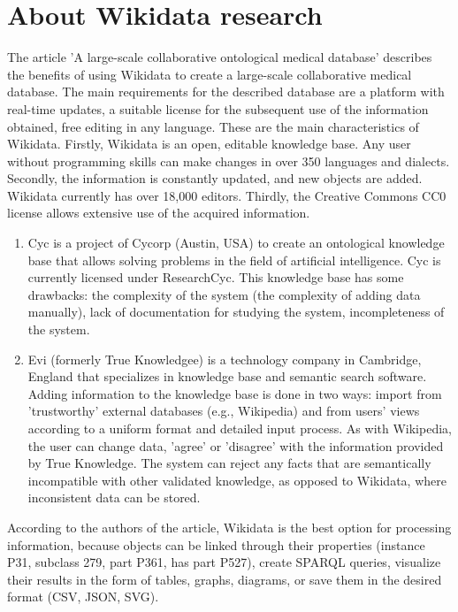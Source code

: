 \section{About Wikidata research}
The article 'A large-scale collaborative ontological medical database' describes the benefits of using Wikidata to create a large-scale collaborative medical database. The main requirements for the described database are a platform with real-time updates, a suitable license for the subsequent use of the information obtained, free editing in any language. These are the main characteristics of Wikidata. Firstly, Wikidata is an open, editable knowledge base. Any user without programming skills can make changes in over 350 languages and dialects. Secondly, the information is constantly updated, and new objects are added. Wikidata currently has over 18,000 editors. Thirdly, the Creative Commons CC0 license allows extensive use of the acquired information.
\begin{enumerate}
\item Cyc is a project of Cycorp (Austin, USA) to create an ontological knowledge base that allows solving problems in the field of artificial intelligence. Cyc is currently licensed under ResearchCyc. This knowledge base has some drawbacks: the complexity of the system (the complexity of adding data manually), lack of documentation for studying the system, incompleteness of the system. 
\item Evi (formerly True Knowledgee) is a technology company in Cambridge, England that specializes in knowledge base and semantic search software. Adding information to the knowledge base is done in two ways: import from 'trustworthy' external databases (e.g., Wikipedia) and from users' views according to a uniform format and detailed input process. As with Wikipedia, the user can change
data, 'agree' or 'disagree' with the information provided by True Knowledge. The system can reject any facts that are semantically incompatible with other validated knowledge, as opposed to Wikidata, where inconsistent data can be stored.
\end{enumerate}
According to the authors of the article, Wikidata is the best option for processing information, because objects can be linked through their properties (instance P31, subclass 279, part P361, has part P527), create SPARQL queries, visualize their results in the form of tables, graphs, diagrams, or save them in the desired format (CSV, JSON, SVG).

